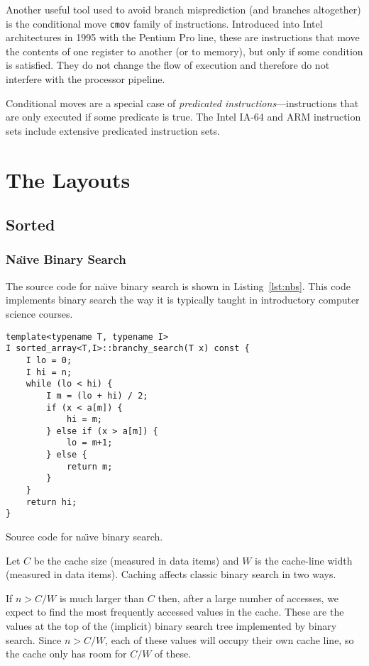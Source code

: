 \documentclass{patmorin}
\newcommand{\lstlabel}[1]{\label{lst:#1}}
\newcommand{\lstref}[1]{Listing~\ref{lst:#1}}
\begin{document}
Another useful tool used to avoid branch misprediction (and branches
altogether) is the conditional move \texttt{cmov} family
of instructions.  Introduced into Intel architectures in 1995 with
the Pentium Pro line, these are instructions that move the contents of
one register to another (or to memory), but only if some condition is
satisfied. They do not change the flow of execution and therefore do
not interfere with the processor pipeline.

Conditional moves are a special case of \emph{predicated
instructions}---instructions that are only executed if some predicate
is true.  The Intel IA-64 and ARM instruction sets include extensive
predicated instruction sets.

\section{The Layouts}

\subsection{Sorted}

\subsubsection{Na\"{\i}ve Binary Search}

The source code for na\"{\i}ve binary search is shown in
\lstref{nbs}. This code implements binary search the way it is typically
taught in introductory computer science courses.

\begin{listing}
\begin{verbatim}
template<typename T, typename I>
I sorted_array<T,I>::branchy_search(T x) const {
    I lo = 0;
    I hi = n;
    while (lo < hi) {
        I m = (lo + hi) / 2;
        if (x < a[m]) {
            hi = m;
        } else if (x > a[m]) {
            lo = m+1;
        } else {
            return m;
        }
    }
    return hi;
}
\end{verbatim}
\caption{Source code for na\"{\i}ve binary search.}
\lstlabel{nbs}
\end{listing}

Let $C$ be the cache size (measured in data items) and $W$ is the
cache-line width (measured in data items).  Caching affects classic
binary search in two ways.

If $n> C/W$ is much larger than $C$ then, after a large number of
accesses, we expect to find the most frequently accessed values in the
cache.  These are the values at the top of the (implicit) binary search
tree implemented by binary search.  Since $n>C/W$, each of these values
will occupy their own cache line, so the cache only has room for $C/W$
of these.
\end{document}
